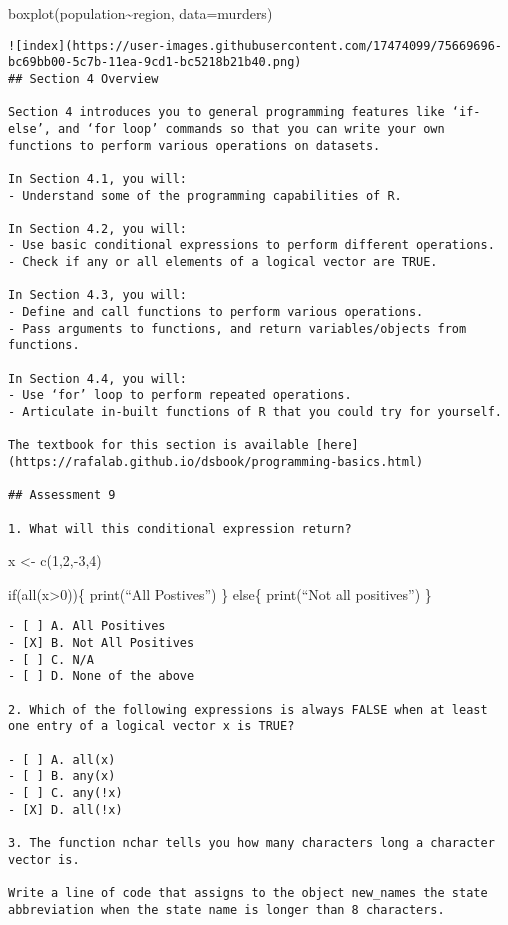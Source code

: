 \documentclass[
]{article}
\begin{document}
boxplot(population\textasciitilde region, data=murders)

\begin{verbatim}
![index](https://user-images.githubusercontent.com/17474099/75669696-bc69bb00-5c7b-11ea-9cd1-bc5218b21b40.png)
## Section 4 Overview

Section 4 introduces you to general programming features like ‘if-else’, and ‘for loop’ commands so that you can write your own functions to perform various operations on datasets.

In Section 4.1, you will:
- Understand some of the programming capabilities of R.

In Section 4.2, you will:
- Use basic conditional expressions to perform different operations.
- Check if any or all elements of a logical vector are TRUE.

In Section 4.3, you will:
- Define and call functions to perform various operations.
- Pass arguments to functions, and return variables/objects from functions.

In Section 4.4, you will:
- Use ‘for’ loop to perform repeated operations.
- Articulate in-built functions of R that you could try for yourself.

The textbook for this section is available [here](https://rafalab.github.io/dsbook/programming-basics.html)

## Assessment 9

1. What will this conditional expression return?
\end{verbatim}

x \textless- c(1,2,-3,4)

if(all(x\textgreater0))\{ print(``All Postives'') \} else\{ print(``Not
all positives'') \}

\begin{verbatim}
- [ ] A. All Positives
- [X] B. Not All Positives
- [ ] C. N/A
- [ ] D. None of the above

2. Which of the following expressions is always FALSE when at least one entry of a logical vector x is TRUE?

- [ ] A. all(x)
- [ ] B. any(x)
- [ ] C. any(!x)
- [X] D. all(!x)

3. The function nchar tells you how many characters long a character vector is.

Write a line of code that assigns to the object new_names the state abbreviation when the state name is longer than 8 characters.
\end{verbatim}
\end{document}

